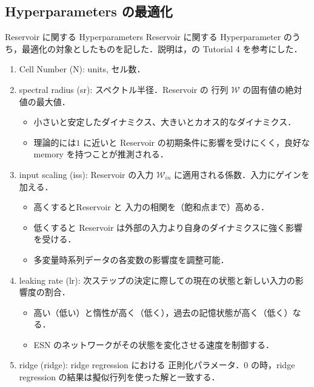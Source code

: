 \subsection{Hyperparameters の最適化}
\begin{frame}{Reservoir に関する Hyperparameters}
    Reservoir に関する Hyperparameter のうち，最適化の対象としたものを記した．説明は，\cite{rpy_doc}の Tutorial 4 を参考にした．
    \begin{enumerate}
        \item Cell Number (N): units, セル数．
        \item spectral radius (sr): スペクトル半径．Reservoir の 行列 $\mathcal{W}$ の固有値の絶対値の最大値．\begin{itemize}
            \item 小さいと安定したダイナミクス、大きいとカオス的なダイナミクス．
            \item 理論的には$1$ に近いと Reservoir の初期条件に影響を受けにくく，良好な memory を持つことが推測される．
        \end{itemize}
        \item input scaling (iss): Reservoir の入力 $\mathcal{W}_{in}$ に適用される係数．入力にゲインを加える．\begin{itemize}
            \item 高くするとReservoir と 入力の相関を（飽和点まで）高める．
            \item 低くすると Reservoir は外部の入力より自身のダイナミクスに強く影響を受ける．
            \item 多変量時系列データの各変数の影響度を調整可能．
        \end{itemize}
        \item leaking rate (lr): 次ステップの決定に際しての現在の状態と新しい入力の影響度の割合．\begin{itemize}
            \item 高い（低い）と惰性が高く（低く），過去の記憶状態が高く（低く）なる．
            \item ESN のネットワークがその状態を変化させる速度を制御する．
        \end{itemize}
        \item ridge (ridge): ridge regression における 正則化パラメータ．$0$ の時，ridge regression の結果は擬似行列を使った解と一致する．
    \end{enumerate}
\end{frame}

